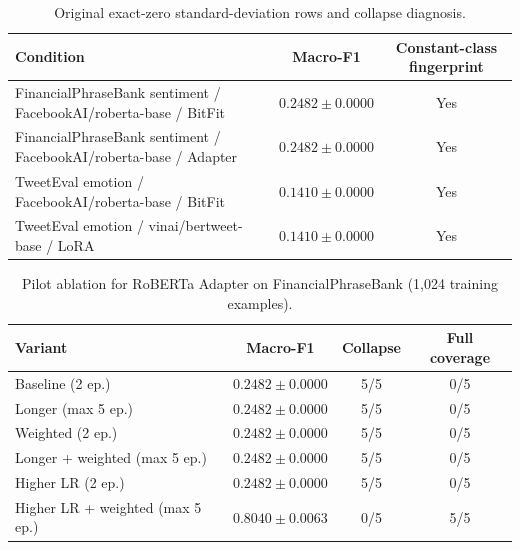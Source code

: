 \begin{table}[t]
\centering\small
\caption{Original exact-zero standard-deviation rows and collapse diagnosis.}
\label{tab:zero-sd-diagnosis}
\begin{tabular}{lcc}
\toprule
Condition & Macro-F1 & Constant-class fingerprint \\
\midrule
FinancialPhraseBank sentiment / FacebookAI/roberta-base / BitFit & $0.2482 \pm 0.0000$ & Yes \\
FinancialPhraseBank sentiment / FacebookAI/roberta-base / Adapter & $0.2482 \pm 0.0000$ & Yes \\
TweetEval emotion / FacebookAI/roberta-base / BitFit & $0.1410 \pm 0.0000$ & Yes \\
TweetEval emotion / vinai/bertweet-base / LoRA & $0.1410 \pm 0.0000$ & Yes \\
\bottomrule
\end{tabular}
\end{table}

\begin{table}[t]
\centering\small
\caption{Pilot ablation for RoBERTa Adapter on FinancialPhraseBank (1,024 training examples).}
\label{tab:pilot-ablation}
\begin{tabular}{lccc}
\toprule
Variant & Macro-F1 & Collapse & Full coverage \\
\midrule
Baseline (2 ep.) & $0.2482 \pm 0.0000$ & 5/5 & 0/5 \\
Longer (max 5 ep.) & $0.2482 \pm 0.0000$ & 5/5 & 0/5 \\
Weighted (2 ep.) & $0.2482 \pm 0.0000$ & 5/5 & 0/5 \\
Longer + weighted (max 5 ep.) & $0.2482 \pm 0.0000$ & 5/5 & 0/5 \\
Higher LR (2 ep.) & $0.2482 \pm 0.0000$ & 5/5 & 0/5 \\
Higher LR + weighted (max 5 ep.) & $0.8040 \pm 0.0063$ & 0/5 & 5/5 \\
\bottomrule
\end{tabular}
\end{table}


